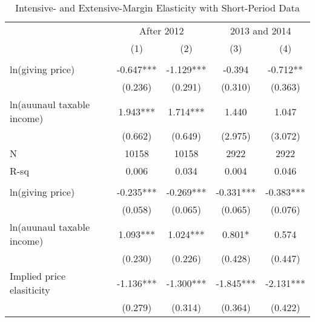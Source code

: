 \documentclass[ review  , 3p ]{elsarticle}
\begin{document}
  \begin{table}

  \caption{\label{tab:kableShortElasticity2}Intensive- and Extensive-Margin Elasticity with Short-Period Data}
  \centering
  \fontsize{7}{9}\selectfont
  \begin{threeparttable}
  \begin{tabular}[t]{lcccc}
  \toprule
  \multicolumn{1}{c}{ } & \multicolumn{2}{c}{After 2012} & \multicolumn{2}{c}{2013 and 2014} \\
  \cmidrule(l{3pt}r{3pt}){2-3} \cmidrule(l{3pt}r{3pt}){4-5}
   & (1) & (2) & (3) & (4)\\
  \midrule
  \addlinespace[0.3em]
  \multicolumn{5}{l}{\textbf{Intensive-Margin Elasticity}}\\
  \hspace{1em}ln(giving price) & -0.647*** & -1.129*** & -0.394 & -0.712**\\
  \hspace{1em} & (0.236) & (0.291) & (0.310) & (0.363)\\
  \hspace{1em}ln(auunaul taxable income) & 1.943*** & 1.714*** & 1.440 & 1.047\\
  \hspace{1em} & (0.662) & (0.649) & (2.975) & (3.072)\\
  \hspace{1em}N & 10158 & 10158 & 2922 & 2922\\
  \hspace{1em}R-sq & 0.006 & 0.034 & 0.004 & 0.046\\
  \addlinespace[0.3em]
  \multicolumn{5}{l}{\textbf{Extensive-Margin Elasticity}}\\
  \hspace{1em}ln(giving price) & -0.235*** & -0.269*** & -0.331*** & -0.383***\\
  \hspace{1em} & (0.058) & (0.065) & (0.065) & (0.076)\\
  \hspace{1em}ln(auunaul taxable income) & 1.093*** & 1.024*** & 0.801* & 0.574\\
  \hspace{1em} & (0.230) & (0.226) & (0.428) & (0.447)\\
  \hspace{1em}Implied price elasiticity & -1.136*** & -1.300*** & -1.845*** & -2.131***\\
  \hspace{1em} & (0.279) & (0.314) & (0.364) & (0.422)\\

\end{tabular}
\end{threeparttable}
\end{table}
\end{document}

